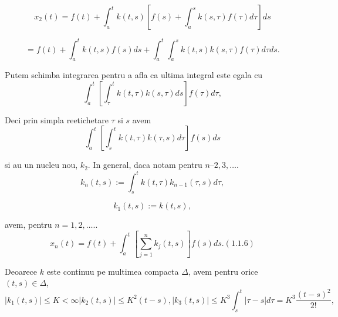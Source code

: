 \documentclass[a4paper,12pt,oneside]{report}
\begin{document}
\begin{displaymath}
  x_{2}\left ( t \right ) = f\left ( t \right ) + \int_{a}^{t}k\left ( t,s \right )\left [ f\left ( s \right ) + \int_{a}^{s} k\left ( s,  \tau  \right )f\left (\tau  \right )d\tau  \right ]ds
\end{displaymath}

 \begin{displaymath}
  =  f\left ( t \right ) + \int_{a}^{t}k\left ( t,s \right )f\left ( s \right )ds + \int_{a}^{t}\int_{a}^{s}k\left ( t,s \right )k\left ( s,\tau  \right )f\left (\tau  \right ) d\tau ds.
\end{displaymath}
 
	Putem schimba integrarea pentru a afla ca ultima integral este egala cu 
\begin{displaymath}
  \int_{a}^{t}\left [ \int_{\tau }^{t}k\left ( t,\tau  \right )k\left ( s,\tau  \right )ds \right ]f\left (\tau   \right )d\tau, 
\end{displaymath}

Deci prin simpla reetichetare \(\tau\) si \(s\) avem 
\begin{displaymath}
  \int_{a}^{t}\left [ \int_{s}^{t}k\left ( t,\tau  \right )k\left ( \tau ,s \right )d\tau  \right ]f\left ( s \right )ds 
\end{displaymath}

si au un nucleu nou,  \(k_{2}\). In general, daca notam pentru \(n – 2,3,…\).
\begin{displaymath}
  k_{n}\left ( t,s \right ) := \int_{s}^{t}k\left ( t,\tau  \right )k_{n-1}\left ( \tau ,s \right )d\tau,
\end{displaymath}

\begin{displaymath}
  k_{1}\left ( t,s \right ) := k\left ( t,s \right ), 
\end{displaymath}

avem, pentru \(n = 1,2,…..\)
\begin{displaymath}
  x_{n}\left ( t \right ) = f\left ( t \right ) + \int_{a}^{t}\left [ \sum_{j= 1}^{n}k_{j}\left ( t,s \right ) \right ]f\left ( s \right )ds. (1.1.6)
\end{displaymath}

	Deoarece \(k\) este continuu pe multimea compacta \(\Delta\), avem pentru orice \(\left ( t,s \right ) \in \Delta\),
\begin{displaymath}
   \left | k_{1}\left ( t,s \right ) \right |\leq K< \infty
\left | k_{2}\left ( t,s \right ) \right |\leq K^{2}\left ( t-s \right ),
\left | k_{3}\left ( t,s \right ) \right |\leq K^{3}\int_{s}^{t}\left | \tau - s \right |d\tau  = K^{3}\frac{\left ( t-s \right )^{2}}{2!},
\end{displaymath}
 
\end{document}
